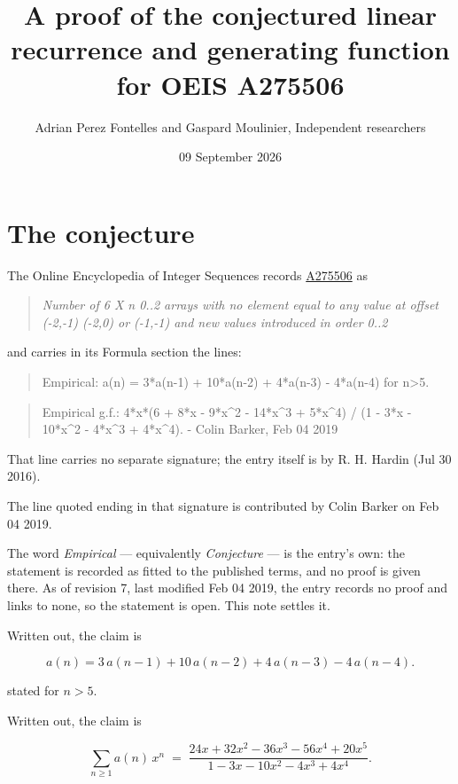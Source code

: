 \documentclass[11pt]{article}
\title{A proof of the conjectured linear recurrence and generating function for OEIS A275506}
\author{Adrian Perez Fontelles and Gaspard Moulinier, Independent researchers}
\date{09 September 2026}
\theoremstyle{definition}
\begin{document}
\maketitle
\section{The conjecture}

The Online Encyclopedia of Integer Sequences records \href{https://oeis.org/A275506}{A275506} as

\begin{quote}\itshape Number of 6 X n 0..2 arrays with no element equal to any value at offset (-2,-1) (-2,0) or (-1,-1) and new values introduced in order 0..2\end{quote}

and carries in its Formula section the lines:

\begin{quote}\ttfamily Empirical: a(n) = 3*a(n-1) + 10*a(n-2) + 4*a(n-3) - 4*a(n-4) for n>5.\end{quote}

\begin{quote}\ttfamily Empirical g.f.: 4*x*(6 + 8*x - 9*x\textasciicircum{}2 - 14*x\textasciicircum{}3 + 5*x\textasciicircum{}4) / (1 - 3*x - 10*x\textasciicircum{}2 - 4*x\textasciicircum{}3 + 4*x\textasciicircum{}4). - Colin Barker, Feb 04 2019\end{quote}

That line carries no separate signature; the entry itself is by R. H. Hardin (Jul 30 2016).

The line quoted ending in that signature is contributed by Colin Barker on Feb 04 2019.

The word {\itshape Empirical} --- equivalently {\itshape Conjecture} --- is the entry's own: the statement is recorded as fitted to the published terms, and no proof is given there. As of revision 7, last modified Feb 04 2019, the entry records no proof and links to none, so the statement is open. This note settles it.

Written out, the claim is

\[a(n) = 3\,a(n-1) + 10\,a(n-2) + 4\,a(n-3) - 4\,a(n-4).\]

stated for $n > 5$.

Written out, the claim is

\[\sum_{n \ge 1} a(n)\,x^n \;=\; \frac{24x + 32x^{2} - 36x^{3} - 56x^{4} + 20x^{5}}{1 - 3x - 10x^{2} - 4x^{3} + 4x^{4}}.\]
\end{document}

